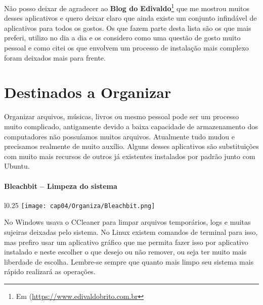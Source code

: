 Não posso deixar de agradecer ao \textbf{Blog do Edivaldo}\footnote{Em (\url{https://www.edivaldobrito.com.br}} que me mostrou muitos desses aplicativos e quero deixar claro que ainda existe um conjunto infindável de aplicativos para todos os gostos. Os que fazem parte desta lista são os que mais preferi, utilizo no dia a dia e os considero como uma questão de gosto muito pessoal e como citei os que envolvem um processo de instalação mais complexo foram deixados mais para frente.

\section{Destinados a Organizar}
Organizar arquivos, músicas, livros ou mesmo pessoal pode ser um processo muito complicado, antigamente devido a baixa capacidade de armazenamento dos computadores não possuíamos muitos arquivos. Atualmente tudo mudou e precisamos realmente de muito auxílio. Alguns desses aplicativos são substituições com muito mais recursos de outros já existentes instalados por padrão junto com Ubuntu.

\paragraph{Bleachbit – Limpeza do sistema}
\begin{minipage}{\textwidth}
 \vspace{5pt}
 \begin{wrapfigure}{l}{0.25\textwidth}
  \vspace{-\baselineskip}
  \texttt{[image: cap04/Organiza/Bleachbit.png]} 
 \end{wrapfigure}
  No Windows usava o CCleaner para limpar arquivos temporários, logs e muitas sujeiras deixadas pelo sistema. No Linux existem comandos de terminal para isso, mas prefiro usar um aplicativo gráfico que me permita fazer isso por aplicativo instalado e neste escolher o que desejo ou não remover, ou seja ter muito mais liberdade de escolha. Lembre-se sempre que quanto mais limpo seu sistema mais rápido realizará as operações.
\end{minipage}

